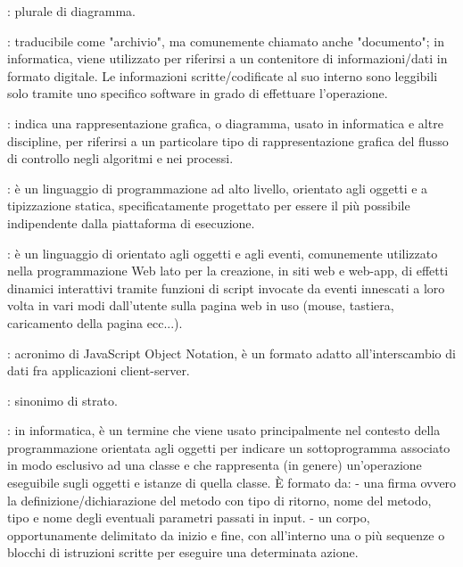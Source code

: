 {		%
		: plurale di diagramma.

	
		: traducibile come "archivio", ma comunemente chiamato anche "documento"; in informatica, viene utilizzato per riferirsi a un contenitore di informazioni/dati in formato digitale. Le informazioni scritte/codificate al suo interno sono leggibili solo tramite uno specifico software in grado di effettuare l'operazione.
	
		: indica una rappresentazione grafica, o diagramma, usato in informatica e altre discipline, per riferirsi a un particolare tipo di rappresentazione grafica del flusso di controllo negli algoritmi e nei processi.
	
	
		: è un linguaggio di programmazione ad alto livello, orientato agli oggetti e a tipizzazione statica, specificatamente progettato per essere il più possibile indipendente dalla piattaforma di esecuzione.
	
		: è un linguaggio di  orientato agli oggetti e agli eventi, comunemente utilizzato nella programmazione Web lato  per la creazione, in siti web e web-app, di effetti dinamici interattivi tramite funzioni di script invocate da eventi innescati a loro volta in vari modi dall'utente sulla pagina web in uso (mouse, tastiera, caricamento della pagina ecc...).
	
		: acronimo di JavaScript Object Notation, è un formato adatto all'interscambio di dati fra applicazioni client-server.
	
	
		: sinonimo di strato.
	
	
		: in informatica, è un termine che viene usato principalmente nel contesto della programmazione orientata agli oggetti per indicare un sottoprogramma associato in modo esclusivo ad una classe e che rappresenta (in genere) un'operazione eseguibile sugli oggetti e istanze di quella classe. È formato da:
- una firma ovvero la definizione/dichiarazione del metodo con tipo di ritorno, nome del metodo, tipo e nome degli eventuali parametri passati in input.
- un corpo, opportunamente delimitato da inizio e fine, con all'interno una o più sequenze o blocchi di istruzioni scritte per eseguire una determinata azione.

}

